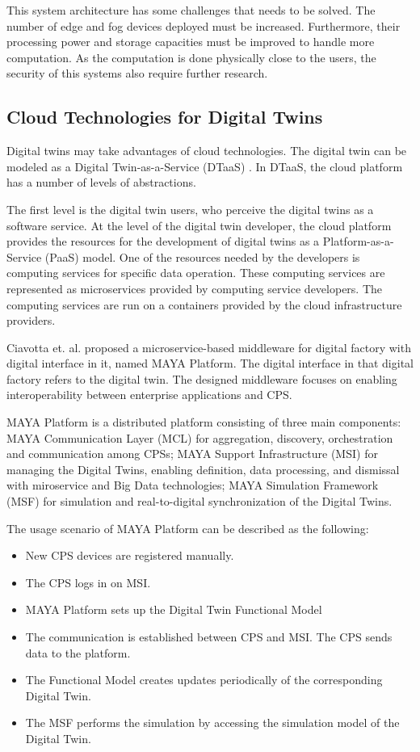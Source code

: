 \documentclass[article]{aaltoseries}
\begin{document}
This system architecture has some challenges that needs to be solved. The number of edge and fog devices deployed must be increased. Furthermore, their processing power and storage capacities must be improved to handle more computation. As the computation is done physically close to the users, the security of this systems also require further research.

\subsection{Cloud Technologies for Digital Twins}
Digital twins may take advantages of cloud technologies. The digital twin can be modeled as a Digital Twin-as-a-Service (DTaaS) \cite{borodulin2017towards}. In DTaaS, the cloud platform has a number of levels of abstractions. 

The first level is the digital twin users, who perceive the digital twins as a software service. At the level of the digital twin developer, the cloud platform provides the resources for the development of digital twins as a Platform-as-a-Service (PaaS) model. One of the resources needed by the developers is computing services for specific data operation. These computing services are represented as microservices provided by computing service developers. The computing services are run on a containers provided by the cloud infrastructure providers.

Ciavotta et. al. \cite{ciavotta2017microservice} proposed a microservice-based middleware for digital factory with digital interface in it, named MAYA Platform. The digital interface in that digital factory refers to the digital twin. The designed middleware focuses on enabling interoperability between enterprise applications and CPS.

MAYA Platform is a distributed platform consisting of three main components: MAYA Communication Layer (MCL) for aggregation, discovery, orchestration and communication among CPSs; MAYA Support Infrastructure (MSI) for managing the Digital Twins, enabling definition, data processing, and dismissal with miroservice and Big Data technologies; MAYA Simulation Framework (MSF) for simulation and real-to-digital synchronization of the Digital Twins.

The usage scenario of MAYA Platform can be described as the following:
\begin{itemize}
	\item New CPS devices are registered manually.
	\item The CPS logs in on MSI.
	\item MAYA Platform sets up the Digital Twin Functional Model
	\item The communication is established between CPS and MSI. The CPS sends data to the platform.
	\item The Functional Model creates updates periodically of the corresponding Digital Twin.
	\item The MSF performs the simulation by accessing the simulation model of the Digital Twin.
\end{itemize}
\end{document}
